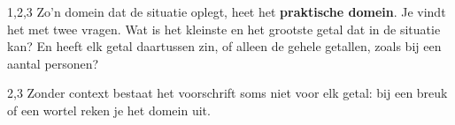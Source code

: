 \begin{alleenvoor}{1,2,3}
Zo'n domein dat de situatie oplegt, heet het \textbf{\textcolor{accent}{praktische domein}}. Je vindt het met twee vragen. Wat is het kleinste en het grootste getal dat in de situatie kan? En heeft elk getal daartussen zin, of alleen de gehele getallen, zoals bij een aantal personen?


\end{alleenvoor}
\begin{alleenvoor}{2,3}
Zonder context bestaat het voorschrift soms niet voor elk getal: bij een breuk of een wortel reken je het domein uit.

\end{alleenvoor}
